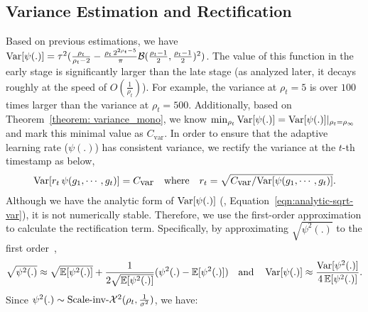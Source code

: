 \subsection{Variance Estimation and Rectification}
\vspace{-0.1cm}
Based on previous estimations, we have $\operatorname{{\rm Var}}[\psi(.)] = \tau^2 (\frac{\rho_t}{\rho_t-2} - \frac{\rho_t \,2^{2\rho_t - 5}}{\pi}{\mathcal{B}}(\frac{\rho_t-1}{2}, \frac{\rho_t-1}{2})^2)$.
The value of this function in the early stage is significantly larger than the late stage (as analyzed later, it decays roughly at the speed of $O(\frac{1}{\rho_t
})$). 
For example, 
the variance at $\rho_t = 5$ is over $100$ times larger than the variance at $\rho_t = 500$.
Additionally, based on Theorem~\ref{theorem: variance_mono}, we know $\min_{\rho_t} \operatorname{{\rm Var}}[\psi(.)] = \operatorname{{\rm Var}}[\psi(.)]|_{\rho_t = \rho_\infty}$ and mark this minimal value as $C_{\mbox{var}}$.
In order to ensure that the adaptive learning rate ($\psi(.)$) has consistent variance, we rectify the variance at the $t$-th timestamp as below,
\begin{align*}
\operatorname{{\rm Var}}[r_t \,\psi(g_1, \cdots, g_t)] = C_{\mbox{var}}
\quad
\mbox{where}
\quad
r_t = \sqrt{{C_{\mbox{var}}}/{\operatorname{{\rm Var}}[\psi(g_1, \cdots, g_t)]}}.
\end{align*}
Although we have the analytic form of $\operatorname{{\rm Var}}[\psi(.)]$ (\ie, Equation~\ref{eqn:analytic-sqrt-var}), it is not numerically stable. 
Therefore, we use the first-order approximation to calculate the rectification term.
Specifically, by approximating $\sqrt{\psi^2(.)}$ to the first order~\citep{wolter2007taylor}, 
\begin{align*}
\sqrt{\psi^2(.)} \approx \sqrt{\operatorname{\mathbb{E}}[\psi^2(.)]} + \frac{1}{2\sqrt{\operatorname{\mathbb{E}}[\psi^2(.)]}}(\psi^2(.) - \operatorname{\mathbb{E}}[\psi^2(.)])
\quad\mbox{and}\quad
\operatorname{{\rm Var}}[\psi(.)] \approx \frac{\operatorname{{\rm Var}}[\psi^2(.)]}{4\operatorname{\mathbb{E}}[\psi^2(.)]}.
\end{align*}
Since $\psi^2(.) \sim \mbox{Scale-inv-}\mathcal{X}^2(\rho_t, \frac{1}{\sigma^2})$, we have:
